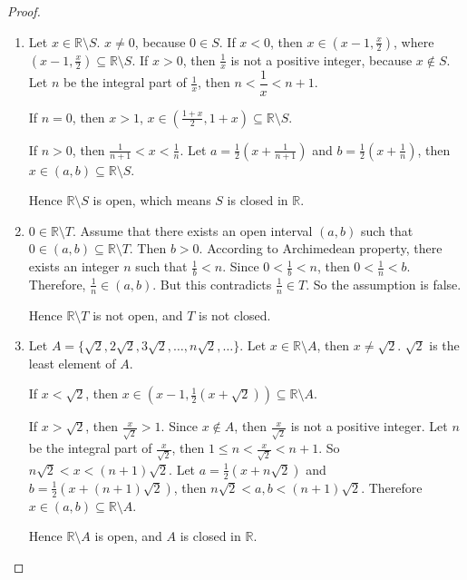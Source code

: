 \begin{proof}
    \begin{enumerate}[label={(\roman*)}]
        \item Let $x\in \mathbb{R}\setminus S$. $x\ne 0$, because $0\in S$. If $x < 0$, then $x\in (x-1, \frac{x}{2})$, where $(x-1, \frac{x}{2})\subseteq \mathbb{R}\setminus S$. If $x > 0$, then $\frac{1}{x}$ is not a positive integer, because $x\notin S$. Let $n$ be the integral part of $\frac{1}{x}$, then $n < \dfrac{1}{x} < n+1$.

              If $n = 0$, then $x > 1$, $x\in \left(\frac{1+x}{2}, 1+x\right)\subseteq \mathbb{R}\setminus S$.

              If $n > 0$, then $\frac{1}{n+1} < x < \frac{1}{n}$. Let $a = \frac{1}{2}\left(x + \frac{1}{n+1} \right)$ and $b = \frac{1}{2}\left(x + \frac{1}{n}\right)$, then $x\in (a, b)\subseteq \mathbb{R}\setminus S$.

              Hence $\mathbb{R}\setminus S$ is open, which means $S$ is closed in $\mathbb{R}$.
        \item $0\in \mathbb{R}\setminus T$. Assume that there exists an open interval $(a, b)$ such that $0\in (a, b)\subseteq \mathbb{R}\setminus T$. Then $b > 0$. According to Archimedean property, there exists an integer $n$ such that $\frac{1}{b} < n$. Since $0 < \frac{1}{b} < n$, then $0 < \frac{1}{n} < b$. Therefore, $\frac{1}{n}\in (a, b)$. But this contradicts $\frac{1}{n}\in T$. So the assumption is false.

              Hence $\mathbb{R}\setminus T$ is not open, and $T$ is not closed.
        \item Let $A = \{ \sqrt{2}, 2\sqrt{2}, 3\sqrt{2}, \ldots, n\sqrt{2}, \ldots \}$. Let $x\in \mathbb{R}\setminus A$, then $x\ne\sqrt{2}$. $\sqrt{2}$ is the least element of $A$.

              If $x < \sqrt{2}$, then $x\in \left(x-1, \frac{1}{2}(x+\sqrt{2})\right)\subseteq \mathbb{R}\setminus A$.

              If $x > \sqrt{2}$, then $\frac{x}{\sqrt{2}} > 1$. Since $x\notin A$, then $\frac{x}{\sqrt{2}}$ is not a positive integer. Let $n$ be the integral part of $\frac{x}{\sqrt{2}}$, then $1\leq n < \frac{x}{\sqrt{2}} < n+1$. So $n\sqrt{2} < x < (n+1)\sqrt{2}$. Let $a = \frac{1}{2}(x + n\sqrt{2})$ and $b = \frac{1}{2}(x + (n+1)\sqrt{2})$, then $n\sqrt{2} < a, b < (n+1)\sqrt{2}$. Therefore $x\in (a, b)\subseteq \mathbb{R}\setminus A$.

              Hence $\mathbb{R}\setminus A$ is open, and $A$ is closed in $\mathbb{R}$.
    \end{enumerate}
\end{proof}
\newpage


